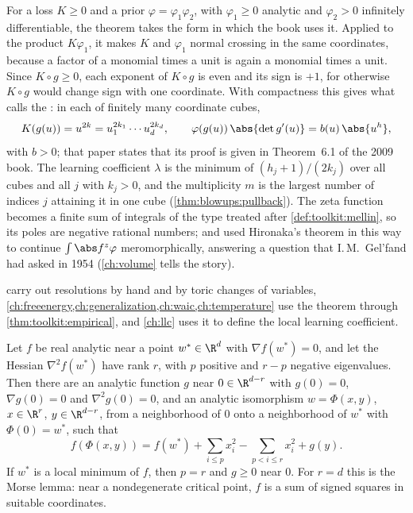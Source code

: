 \begin{refsection}
For a loss $K\ge0$ and a prior $\varphi=\varphi_1\varphi_2$, with $\varphi_1\ge0$ analytic and $\varphi_2>0$ infinitely differentiable, the theorem takes the form in which the book uses it. Applied to the product $K\varphi_1$, it makes $K$ and $\varphi_1$ normal crossing in the same coordinates, because a factor of a monomial times a unit is again a monomial times a unit. Since $K\circ g\ge0$, each exponent of $K\circ g$ is even and its sign is $+1$, for otherwise $K\circ g$ would change sign with one coordinate. With compactness this gives what \textcite[Theorem~1]{Watanabe2013} calls the : in each of finitely many coordinate cubes,
\begin{equation}\label{eq:toolkit:standard}
K(g(u))=u^{2k}=u_1^{2k_1}\cdots u_d^{2k_d},\qquad\varphi(g(u))\,\abs{\det g'(u)}=b(u)\,\abs{u^h},
\end{equation}
with $b>0$; that paper states that its proof is given in Theorem~6.1 of the 2009 book. The learning coefficient $\lambda$ is the minimum of $(h_j+1)/(2k_j)$ over all cubes and all $j$ with $k_j>0$, and the multiplicity $m$ is the largest number of indices $j$ attaining it in one cube (\cref{thm:blowups:pullback}). The zeta function becomes a finite sum of integrals of the type treated after \cref{def:toolkit:mellin}, so its poles are negative rational numbers; \textcite{BernsteinGelfand1969} and \textcite{Atiyah1970} used Hironaka's theorem in this way to continue $\int\abs f^z\varphi$ meromorphically, answering a question that I.\,M.\ Gel'fand had asked in 1954 (\cref{ch:volume} tells the story).

 carry out resolutions by hand and by toric changes of variables, \cref{ch:freeenergy,ch:generalization,ch:waic,ch:temperature} use the theorem through \cref{thm:toolkit:empirical}, and \cref{ch:llc} uses it to define the local learning coefficient.

\begin{theorem}\label{thm:toolkit:splitting}
Let $f$ be real analytic near a point $w^*\in\R^d$ with $\nabla f(w^*)=0$, and let the Hessian $\nabla^2f(w^*)$ have rank $r$, with $p$ positive and $r-p$ negative eigenvalues. Then there are an analytic function $g$ near $0\in\R^{d-r}$ with $g(0)=0$, $\nabla g(0)=0$ and $\nabla^2g(0)=0$, and an analytic isomorphism $w=\Phi(x,y)$, $x\in\R^r$, $y\in\R^{d-r}$, from a neighborhood of $0$ onto a neighborhood of $w^*$ with $\Phi(0)=w^*$, such that
\[
f(\Phi(x,y))=f(w^*)+\sum_{i\le p}x_i^2-\sum_{p<i\le r}x_i^2+g(y).
\]
If $w^*$ is a local minimum of $f$, then $p=r$ and $g\ge0$ near $0$. For $r=d$ this is the Morse lemma: near a nondegenerate critical point, $f$ is a sum of signed squares in suitable coordinates.
\end{theorem}


\end{refsection}

